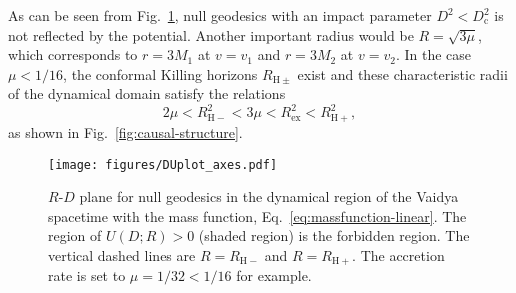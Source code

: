 \documentclass[prd,showpacs,preprintnumbers,groupedaddress,superscriptaddress,nofootinbib,11pt]{revtex4-1} %
\theoremstyle{newplain}
\newcommand{\mr}[1]{\mathrm{#1}}
\begin{document}
As can be seen from Fig.~\ref{fig:conformal-potential}, null geodesics with an impact parameter $D^2<D_\text{c}^2$ is not reflected by the potential.
Another important radius would be $R=\sqrt{3\mu}$, which corresponds to $r=3M_1$ at $v=v_1$ and $r=3M_2$ at $v=v_2$.
In the case $\mu<1/16$, the conformal Killing horizons $R_{\mr{H}\pm}$ exist and these characteristic radii of the dynamical domain satisfy the relations
\begin{equation}
2\mu<R_{\mr{H}-}^2<3\mu<R_{\mr{ex}}^2<R_{\mr{H}+}^2,
\end{equation}
as shown in Fig.~\ref{fig:causal-structure}.
\begin{figure}[h]
\centering
\texttt{[image: figures/DUplot\_axes.pdf]}
\caption{
\label{fig:conformal-potential}
$R$-$D$ plane for null geodesics in the dynamical region of the Vaidya spacetime with the mass function, Eq.~\eqref{eq:massfunction-linear}.
The region of $U(D;R)>0$ (shaded region) is the forbidden region.
The vertical dashed lines are $R=R_{\mr{H}-}$ and $R=R_{\mr{H}+}$.
The accretion rate is set to  $\mu=1/32<1/16$ for example.
}
\end{figure}


\end{document}
